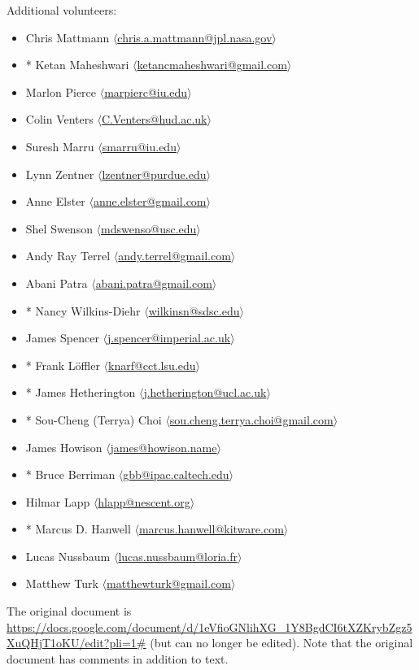 \documentclass[11pt, oneside]{amsart}
\begin{document}
Additional volunteers:
\begin{itemize}
\item Chris Mattmann $\langle$\url{chris.a.mattmann@jpl.nasa.gov}$\rangle$
\item * Ketan Maheshwari $\langle$\url{ketancmaheshwari@gmail.com}$\rangle$
\item Marlon Pierce $\langle$\url{marpierc@iu.edu}$\rangle$
\item Colin Venters $\langle$\url{C.Venters@hud.ac.uk}$\rangle$
\item Suresh Marru $\langle$\url{smarru@iu.edu}$\rangle$
\item Lynn Zentner $\langle$\url{lzentner@purdue.edu}$\rangle$
\item Anne Elster $\langle$\url{anne.elster@gmail.com}$\rangle$
\item Shel Swenson $\langle$\url{mdswenso@usc.edu}$\rangle$
\item Andy Ray Terrel $\langle$\url{andy.terrel@gmail.com}$\rangle$
\item Abani Patra $\langle$\url{abani.patra@gmail.com}$\rangle$
\item * Nancy Wilkins-Diehr $\langle$\url{wilkinsn@sdsc.edu}$\rangle$
\item James Spencer $\langle$\url{j.spencer@imperial.ac.uk}$\rangle$
\item * Frank L\"{o}ffler $\langle$\url{knarf@cct.lsu.edu}$\rangle$
\item * James Hetherington $\langle$\url{j.hetherington@ucl.ac.uk}$\rangle$
\item * Sou-Cheng (Terrya) Choi $\langle$\url{sou.cheng.terrya.choi@gmail.com}$\rangle$
\item James Howison $\langle$\url{james@howison.name}$\rangle$
\item * Bruce Berriman $\langle$\url{gbb@ipac.caltech.edu}$\rangle$
\item Hilmar Lapp $\langle$\url{hlapp@nescent.org}$\rangle$
\item * Marcus D. Hanwell $\langle$\url{marcus.hanwell@kitware.com}$\rangle$
\item Lucas Nussbaum $\langle$\url{lucas.nussbaum@loria.fr}$\rangle$
\item Matthew Turk $\langle$\url{matthewturk@gmail.com}$\rangle$
\end{itemize}

The original document is
\url{https://docs.google.com/document/d/1eVfioGNlihXG_1Y8BgdCI6tXZKrybZgz5XuQHjT1oKU/edit?pli=1#}
(but can no longer be edited).  Note that the original document has
comments in addition to text.
\end{document}
